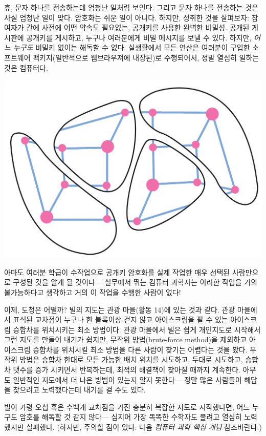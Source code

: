 \documentclass[]{article}
\begin{document}
휴, 문자 하나를 전송하는데 엄청난 일처럼 보인다. 그리고 문자 하나를
전송하는 것은 사실 엄청난 일이 맞다. 암호화는 쉬운 일이 아니다. 하지만,
성취한 것을 살펴보자: 참여자가 간에 사전에 어떤 약속도 필요없는,
공개키를 사용한 완벽한 비밀성. 공개된 게시판에 공개키를 게시하고, 누구나
여러분에게 비밀 메시지를 보낼 수 있다. 하지만, \emph{어느 누구도} 비밀키
없이는 해독할 수 없다. 실생활에서 모든 연산은 여러분이 구입한 소프트웨어
팩키지(일반적으로 웹브라우져에 내장된)로 수행되어서, 정말 열심히 일하는
것은 컴퓨터다.

\includegraphics{csunplugged/05-part/img/ch19-public-key/18-public-key-04-intersection.png}

아마도 여러분 학급이 수작업으로 공개키 암호화를 실제 작업한 매우 선택된
사람만으로 구성된 것을 알게 될 것이다--- 실무에서 뛰는 컴퓨터 과학자는
이러한 작업을 거의 불가능하다고 생각하고 거의 이 작업을 수행한 사람이
없다!

이제, 도청은 어떨까? 빌의 지도는 관광 마을(활동 14)에 있는 것과 같다.
관광 마을에서 표식된 교차점이 누구나 한 블록이상 걷지 않고 아이스크림을
팔 수 있는 아이스크림 승합차를 위치시키는 최소 방법이다. 관광 마을에서
빌은 쉽게 개인지도로 시작해서 그런 지도를 만들어 내기가 쉽지만, 무작위
방법(brute-force method)을 제외하고 아이스크림 승합차를 위치시킬 최소
방법을 다른 사람이 찾기는 어렵다는 것을 봤다. 무작위 방법은 승합차
한대로 모든 가능한 배치 위치를 시도하고, 두대로 시도하고, 승합차 댓수를
증가 시키면서 반복하는데, 최적의 해결책이 찾아질 때까지 계속한다. 아무도
일반적인 지도에서 더 나은 방법이 있는지 알지 못한다--- 정말 많은
사람들이 해답을 찾으려고 노력했다는데 내기를 걸 수도 있다.

빌이 가령 오십 혹은 수백개 교차점을 가진 충분히 복잡한 지도로
시작했다면, 어느 누구도 암호를 해독할 것 같지 않다--- 심지어 가장 똑똑한
수학자도 풀려고 열심히 노력했지만 실패했다. (하지만, 주의할 점이 있다:
다음 \emph{컴퓨터 과학 핵심 개념} 참조바란다.)
\end{document}
